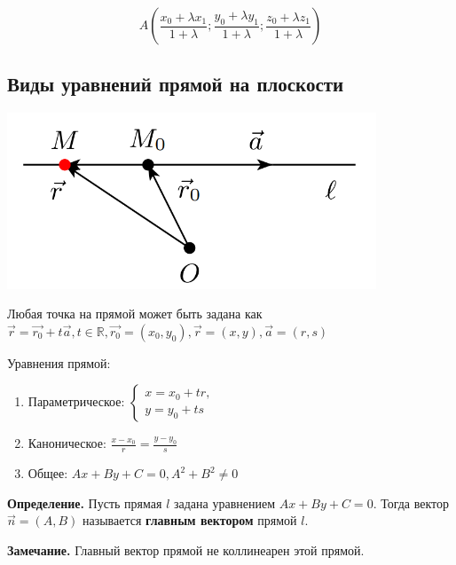 \documentclass[a4paper]{article}
\begin{document}
\begin{equation}
\displaystyle A \left( \frac{x_0 + \lambda x_1}{1 + \lambda}; \frac{y_0 + \lambda y_1}{1 + \lambda}; \frac{z_0 + \lambda z_1}{1+\lambda}\right)
\end{equation}

\newpage \begin{center}\begin{Large}\end{Large}\end{center}

\subsection*{Виды уравнений прямой на плоскости}

\includegraphics[width=11cm]{t6}

Любая точка на прямой может быть задана как $\vec{r} = \vec{r_0} + t\vec{a}, t \in \mathbb{R}, \vec{r_0} = (x_0, y_0), \vec{r} = (x,y), \vec{a} = (r, s)$ 

Уравнения прямой:
\begin{enumerate}


\item Параметрическое: $
 \begin{cases}
   x = x_0 + tr,
   \\
   y = y_0 + ts
 \end{cases}$

\item Каноническое: $\displaystyle \frac{x-x_0}{r} = \frac{y-y_0}{s}$
\item Общее: $Ax + By + C = 0, A^2 + B^2 \neq 0$
\end{enumerate}

\textbf{Определение.} Пусть прямая $l$ задана уравнением $Ax + By + C = 0$. Тогда вектор $\vec{n} = (A, B)$ называется \textbf{главным вектором} прямой $l$.

\begin{htheorem}
\textbf{Замечание.} Главный вектор прямой не коллинеарен этой прямой.
\end{htheorem}
\end{document}

